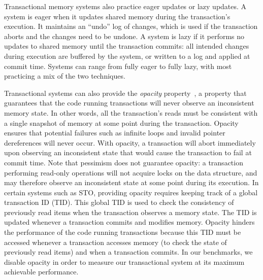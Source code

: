 Transactional memory systems also practice eager updates or lazy updates. A system is eager when it updates shared memory during the transaction's execution. It maintains an ``undo'' log of changes, which is used if the transaction aborts and the changes need to be undone. 
A system is lazy if it performs no updates to shared memory until the transaction commits: all intended changes during execution are buffered by the system, or written to a log and applied at commit time. Systems can range from fully eager to fully lazy, with most practicing a mix of the two techniques.

Transactional systems can also provide the \emph{opacity} property~\cite{opacity}, a property that guarantees that the code running transactions will never observe an inconsistent memory state. 
In other words, all the transaction's reads must be consistent with a single snapshot of memory at some point during the transaction.
Opacity ensures that potential failures such as infinite loops and invalid pointer dereferences will never occur. With opacity, a transaction will abort immediately upon observing an inconsistent state that would cause the transaction to fail at commit time. Note that pessimism does not guarantee opacity: a transaction performing read-only operations will not acquire locks on the data structure, and may therefore observe an inconsistent state at some point during its execution.
In certain systems such as STO, providing opacity requires keeping track of a global transaction ID (TID). This global TID is used to check the consistency of previously read items when the transaction observes a memory state. The TID is updated whenever a transaction commits and modifies memory. Opacity hinders the performance of the code running transactions because this TID must be accessed whenever a transaction accesses memory (to check the state of previously read items) and when a transaction commits. In our benchmarks, we disable opacity in order to measure our transactional system at its maximum achievable performance.

